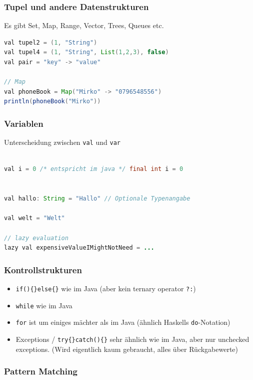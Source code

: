 \subsubsection{Tupel und andere Datenstrukturen}

Es gibt Set, Map, Range, Vector, Trees, Queues etc.

\begin{lstlisting}[language=java]
val tupel2 = (1, "String")
val tupel4 = (1, "String", List(1,2,3), false)
val pair = "key" -> "value"

// Map
val phoneBook = Map("Mirko" -> "0796548556")
println(phoneBook("Mirko"))
\end{lstlisting}

\subsubsection{Variablen}
Unterscheidung zwischen \lstinline|val| und \lstinline|var|

\begin{lstlisting}[language=java]

val i = 0 /* entspricht im java */ final int i = 0


val hallo: String = "Hallo" // Optionale Typenangabe

val welt = "Welt"

// lazy evaluation
lazy val expensiveValueIMightNotNeed = ...

\end{lstlisting}

\subsubsection{Kontrollstrukturen}

\begin{itemize}
	\item \lstinline|if(){}else{}| wie im Java (aber kein ternary operator \lstinline|?:|)
	\item \lstinline|while| wie im Java
	\item \lstinline|for| ist um einiges mächter als im Java (ähnlich Haskells \lstinline|do|-Notation)
	\item Exceptions / \lstinline|try{}catch(){}| sehr ähnlich wie im Java, aber nur unchecked exceptions. (Wird eigentlich kaum gebraucht, alles über Rückgabewerte)
\end{itemize}

\subsubsection{Pattern Matching}

